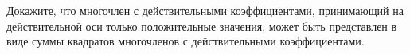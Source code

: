 \documentclass{article}
\begin{document}
Докажите, что многочлен с действительными коэффициентами, принимающий на действительной оси только положительные значения, 
может быть представлен в виде суммы квадратов многочленов с действительными коэффициентами.
\end{document}
